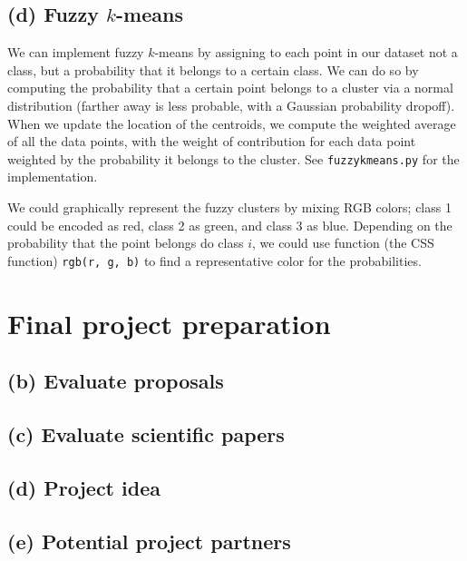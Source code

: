 \documentclass[11pt]{article}
\begin{document}
\subsection*{(d) Fuzzy $k$-means}
We can implement fuzzy $k$-means by assigning to each point in our
dataset not a class, but a probability that it belongs to a certain
class. We can do so by computing the probability that a certain
point belongs to a cluster via a normal distribution (farther away
is less probable, with a Gaussian probability dropoff). When we
update the location of the centroids, we compute the weighted average
of all the data points, with the weight of contribution for each
data point weighted by the probability it belongs to the cluster.
See {\tt fuzzykmeans.py} for the implementation.

We could graphically represent the fuzzy clusters by mixing RGB colors;
class 1 could be encoded as red, class 2 as green, and class 3 as blue.
Depending on the probability that the point belongs do class $i$, we could
use function (the CSS function) {\tt rgb(r, g, b)} to find a representative
color for the probabilities.

\section{Final project preparation}
\subsection*{(b) Evaluate proposals}

\subsection*{(c) Evaluate scientific papers}

\subsection*{(d) Project idea}

\subsection*{(e) Potential project partners}
\end{document}
